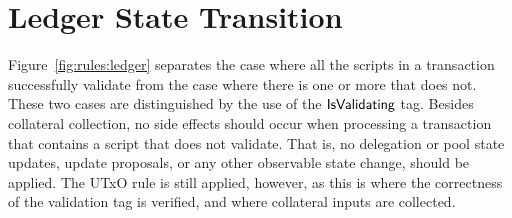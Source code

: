 \section{Ledger State Transition}
\label{sec:ledger-trans}

Figure~\ref{fig:rules:ledger} separates the case where all the scripts
in a transaction successfully validate from the case where there is one or more that does not.
These two cases are distinguished by the use of the $\mathsf{IsValidating}$ tag.
%
Besides collateral collection, no side effects should occur when processing a
transaction that contains a script that does not validate. That is, no
delegation or pool state updates, update proposals, or any other observable state change, should be
applied. The UTxO rule is still applied, however, as this is where the correctness of the
validation tag is verified, and where collateral inputs are collected.

